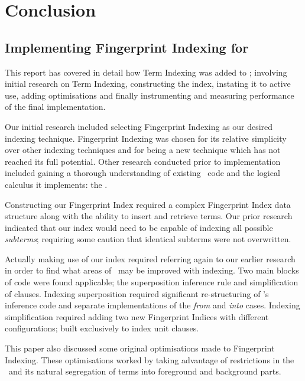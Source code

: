 
\chapter{Conclusion}
\label{cha:conclusion}

\section{Implementing Fingerprint Indexing for \Beagle}

This report has covered in detail how Term Indexing was added to \beagle;
involving initial research on Term Indexing, constructing the index, instating it
to active use, adding optimisations and finally instrumenting and measuring performance of the final implementation.

Our initial research included selecting Fingerprint Indexing as our desired indexing technique.
Fingerprint Indexing was chosen for its relative simplicity over other indexing techniques
and for being a new technique which has not reached its full potential. Other
research conducted prior to implementation included gaining a thorough understanding
of existing \beagle\ code and the logical calculus it implements: the \HSWAC.

Constructing our Fingerprint Index required a complex Fingerprint Index data structure
along with the ability to insert and retrieve terms. Our prior research indicated that
our index would need to be capable of indexing all possible \emph{subterms}; requiring
some caution that identical subterms were not overwritten.

Actually making use of our index required referring again to our earlier research in order to
find what areas of \beagle\ may be improved with indexing. Two main blocks
of code were found applicable; the superposition inference rule and simplification
of clauses. Indexing superposition required significant re-structuring of \beagle's
inference code and separate implementations of the \emph{from} and \emph{into} cases.
Indexing simplification required adding two new Fingerprint Indices with different
configurations; built exclusively to index unit clauses.

This paper also discussed some original optimisations made to Fingerprint Indexing.
These optimisations worked by taking advantage of restrictions in the \HSWAC\ and
its natural segregation of terms into foreground and background parts.

